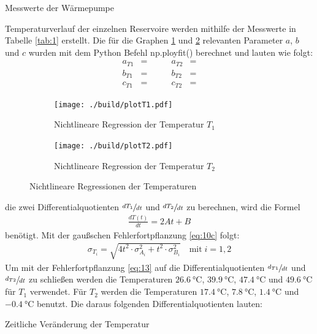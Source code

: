 \begin{table}[H]
    \centering
    
    \caption{Messwerte der Wärmepumpe}
    \label{tab:1}
\end{table}
\newpage

\justifying Temperaturverlauf der einzelnen Reservoire werden mithilfe der Messwerte in Tabelle \ref{tab:1} erstellt. Die für
die Graphen \ref{fig:3a} und \ref{fig:3b} relevanten Parameter $a$, $b$ und $c$ wurden mit dem Python Befehl np.ployfit() \cite{numpy}
berechnet und lauten wie folgt:
\begin{subequations}
\begin{align}
    a_{T1} &= \text{} \qquad &a_{T2} &= \text{} \label{eq:11a}\\
    b_{T1} &= \text{} \qquad &b_{T2} &= \text{} \label{eq:11b}\\
    c_{T1} &= \text{} \qquad &c_{T2} &= \text{} \label{eq:11c}
\end{align}
\end{subequations}

\begin{figure}[H]
    \begin{subfigure}{0.495\linewidth}
        \centering
        \texttt{[image: ./build/plotT1.pdf]}
        \caption{Nichtlineare Regression der Temperatur $T_1$}
        \label{fig:3a}
    \end{subfigure}
    \begin{subfigure}{0.495\linewidth}
        \centering
        \texttt{[image: ./build/plotT2.pdf]}
        \caption{Nichtlineare Regression der Temperatur $T_2$}
        \label{fig:3b}
    \end{subfigure}
    \caption{Nichtlineare Regressionen der Temperaturen}
    \label{fig:3}
\end{figure}

\justifying die zwei Differentialquotienten $\sfrac{dT_{1}}{dt}$ und $\sfrac{dT_{2}}{dt}$ zu berechnen, wird die Formel
\begin{align}
    \frac{dT(t)}{dt} = 2At + B \label{eq:12}
\end{align}
benötigt. Mit der gaußschen Fehlerfortpflanzung \eqref{eq:10c} folgt:
\begin{align}
    \sigma_{T_i} = \sqrt{4t^2 \cdot \sigma _{A_i}^2 + t^2 \cdot \sigma _{B_i}^2} \label{eq:13}\quad \text{mit}\; i = 1,2
\end{align}
Um mit der Fehlerfortpflanzung \eqref{eq:13} auf die Differentialquotienten $\sfrac{d_{T1}}{dt}$ und $\sfrac{d_{T2}}{dt}$ zu schließen werden die 
Temperaturen $\SI{26.6}{\celsius}$, $\SI{39.9}{\celsius}$, $\SI{47.4}{\celsius}$ und $\SI{49.6}{\celsius}$ für $T_1$ verwendet. Für $T_2$ 
werden die Temperaturen $\SI{17.4}{\celsius}$, $\SI{7.8}{\celsius}$, $\SI{1.4}{\celsius}$ und $\SI{-0.4}{\celsius}$ benutzt.
Die daraus folgenden Differentialquotienten lauten:
\begin{table}[H]
    \centering
    
    \caption{Zeitliche Veränderung der Temperatur} \label{tab:2}
\end{table}


